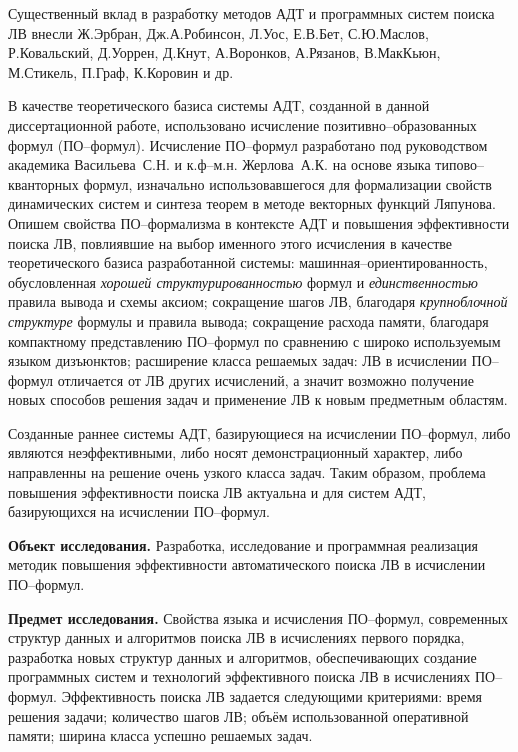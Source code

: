\documentclass[a4paper]{report}
\begin{document}
Существенный вклад в разработку методов АДТ и программных систем поиска ЛВ внесли Ж.Эрбран, Дж.А.Робинсон, Л.Уос, Е.В.Бет, С.Ю.Маслов, Р.Ковальский, Д.Уоррен, Д.Кнут, А.Воронков, А.Рязанов, В.МакКьюн, М.Сти\-кель, П.Граф, К.Коровин и др. %

В качестве теоретического базиса системы АДТ, созданной в данной диссертационной работе, использовано исчисление позитивно--образованных формул (ПО--формул). Исчисление ПО--формул разработано под руководством академика Васильева~С.Н. и к.ф--м.н. Жерлова~А.К. на основе языка типово--кванторных формул, изначально использовавшегося для формализации свойств динамических систем и синтеза теорем в методе векторных функций Ляпунова. Опишем свойства ПО--формализма в контексте АДТ и повышения эффективности поиска ЛВ, повлиявшие на выбор именного этого исчисления в качестве теоретического базиса разработанной системы: машинная--ориентированность, обусловленная \emph{хорошей структурированностью} формул и \emph{единственностью} правила вывода и схемы аксиом; сокращение шагов ЛВ, благодаря \emph{крупноблочной структуре} формулы и правила вывода; сокращение расхода памяти, благодаря компактному представлению ПО--формул по сравнению с широко используемым языком дизъюнктов; расширение класса решаемых задач: ЛВ в исчислении ПО--формул отличается от ЛВ других исчислений, а значит возможно получение новых способов решения задач и применение ЛВ к новым предметным областям.

Созданные раннее системы АДТ, базирующиеся на исчислении ПО--формул, либо являются неэффективными, либо носят демонстрационный характер, либо направленны на решение очень узкого класса задач. Таким образом, проблема повышения эффективности поиска ЛВ актуальна и для систем АДТ, базирующихся на исчислении ПО--формул.

\textbf{Объект исследования.}
Разработка, исследование и программная реализация методик повышения эффективности автоматического поиска ЛВ в исчислении ПО--формул.

\textbf{Предмет исследования.}
Свойства языка и исчисления ПО--формул, современных структур данных и алгоритмов поиска ЛВ в исчислениях первого порядка, разработка новых структур данных и алгоритмов, обеспечивающих создание программных систем и технологий эффективного поиска ЛВ в исчислениях ПО--формул. Эффективность поиска ЛВ задается следующими критериями: время решения задачи; количество шагов ЛВ; объём использованной оперативной памяти; ширина класса успешно решаемых задач.
\end{document}
